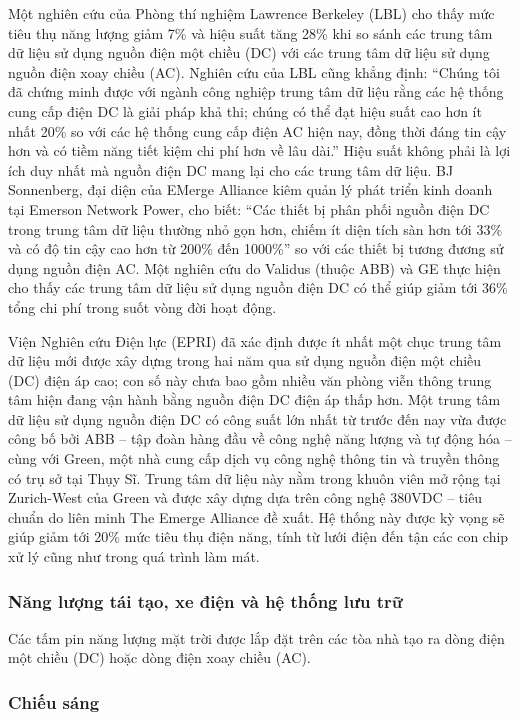 \documentclass{thesis}
\begin{document}
Một nghiên cứu của Phòng thí nghiệm Lawrence Berkeley (LBL) cho thấy
mức tiêu thụ năng lượng giảm 7\% và hiệu suất tăng 28\% khi so sánh
các trung tâm dữ liệu sử dụng nguồn điện một chiều (DC) với các trung
tâm dữ liệu sử dụng nguồn điện xoay chiều (AC). Nghiên cứu của LBL
cũng khẳng định: “Chúng tôi đã chứng minh được với ngành công nghiệp
trung tâm dữ liệu rằng các hệ thống cung cấp điện DC là giải pháp khả
thi; chúng có thể đạt hiệu suất cao hơn ít nhất 20\% so với các hệ
thống cung cấp điện AC hiện nay, đồng thời đáng tin cậy hơn và có
tiềm năng tiết kiệm chi phí hơn về lâu dài.” Hiệu suất không phải là
lợi ích duy nhất mà nguồn điện DC mang lại cho các trung tâm dữ liệu.
BJ Sonnenberg, đại diện của EMerge Alliance kiêm quản lý phát triển
kinh doanh tại Emerson Network Power, cho biết: “Các thiết bị phân
phối nguồn điện DC trong trung tâm dữ liệu thường nhỏ gọn hơn, chiếm
ít diện tích sàn hơn tới 33\% và có độ tin cậy cao hơn từ 200\% đến
1000\%” so với các thiết bị tương đương sử dụng nguồn điện AC. Một
nghiên cứu do Validus (thuộc ABB) và GE thực hiện cho thấy các trung
tâm dữ liệu sử dụng nguồn điện DC có thể giúp giảm tới 36\% tổng chi
phí trong suốt vòng đời hoạt động.

Viện Nghiên cứu Điện lực (EPRI) đã xác định được ít nhất một chục
trung tâm dữ liệu mới được xây dựng trong hai năm qua sử dụng nguồn
điện một chiều (DC) điện áp cao; con số này chưa bao gồm nhiều văn
phòng viễn thông trung tâm hiện đang vận hành bằng nguồn điện DC điện
áp thấp hơn. Một trung tâm dữ liệu sử dụng nguồn điện DC có công suất
lớn nhất từ trước đến nay vừa được công bố bởi ABB – tập đoàn hàng
đầu về công nghệ năng lượng và tự động hóa – cùng với Green, một nhà
cung cấp dịch vụ công nghệ thông tin và truyền thông có trụ sở tại
Thụy Sĩ. Trung tâm dữ liệu này nằm trong khuôn viên mở rộng tại
Zurich-West của Green và được xây dựng dựa trên công nghệ 380VDC –
tiêu chuẩn do liên minh The Emerge Alliance đề xuất. Hệ thống này
được kỳ vọng sẽ giúp giảm tới 20\% mức tiêu thụ điện năng, tính từ
lưới điện đến tận các con chip xử lý cũng như trong quá trình làm mát.

\subsubsection{Năng lượng tái tạo, xe điện và hệ thống lưu trữ}

Các tấm pin năng lượng mặt trời được lắp đặt trên các tòa nhà tạo ra
dòng điện một chiều (DC) hoặc dòng điện xoay chiều (AC).

\subsubsection{Chiếu sáng}
\end{document}
